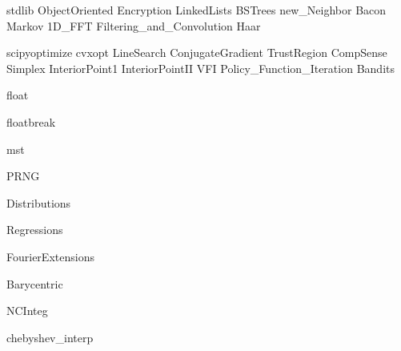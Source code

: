 \documentclass[nociteref]{SIAM-GH-book}
\begin{document}
{stdlib}
{ObjectOriented}
{Encryption}
{LinkedLists}
{BSTrees}
{new_Neighbor}
{Bacon}
{Markov}
{1D_FFT}
{Filtering_and_Convolution}
{Haar}


{scipyoptimize}
{cvxopt}
{LineSearch}
{ConjugateGradient}
{TrustRegion}
{CompSense}
{Simplex}
{InteriorPoint1}
{InteriorPointII}
{VFI}
{Policy_Function_Iteration}
{Bandits}



{float}

{floatbreak}

{mst}

{PRNG}

{Distributions}

{Regressions}

{FourierExtensions}

{Barycentric}

{NCInteg}

{chebyshev_interp}
\end{document}

